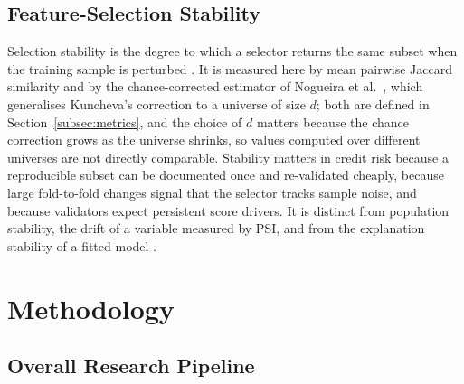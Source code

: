 \documentclass[final,5p,twocolumn]{elsarticle}
\begin{document}
\subsection{Feature-Selection Stability}
\label{subsec:fs_stability_background}

Selection stability is the degree to which a selector returns the same subset when the training sample is perturbed \cite{kalousis2007}. It is measured here by mean pairwise Jaccard similarity \cite{jaccard1901} and by the chance-corrected estimator of Nogueira et al.\ \cite{nogueira2018}, which generalises Kuncheva's correction \cite{kuncheva2007} to a universe of size $d$; both are defined in Section~\ref{subsec:metrics}, and the choice of $d$ matters because the chance correction grows as the universe shrinks, so values computed over different universes are not directly comparable. Stability matters in credit risk because a reproducible subset can be documented once and re-validated cheaply, because large fold-to-fold changes signal that the selector tracks sample noise, and because validators expect persistent score drivers. It is distinct from population stability, the drift of a variable measured by PSI, and from the explanation stability of a fitted model \cite{ballegeer2025}.


\section{Methodology}
\label{sec:methodology}

\subsection{Overall Research Pipeline}
\label{subsec:pipeline}
\end{document}
